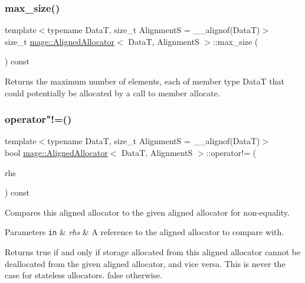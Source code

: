 \subsubsection{\texorpdfstring{max\+\_\+size()}{max\_size()}}
{\footnotesize\ttfamily template$<$typename DataT, size\+\_\+t AlignmentS = \+\_\+\+\_\+alignof(\+Data\+T)$>$ \\
size\+\_\+t \hyperlink{structmage_1_1_aligned_allocator}{mage\+::\+Aligned\+Allocator}$<$ DataT, AlignmentS $>$\+::max\+\_\+size (\begin{DoxyParamCaption}{ }\end{DoxyParamCaption}) const\hspace{0.3cm}{\ttfamily [noexcept]}}

Returns the maximum number of elements, each of member type {\ttfamily DataT} that could potentially be allocated by a call to member allocate. \hypertarget{structmage_1_1_aligned_allocator_a878ebf0d8ad7e6e91bc9d788c8bdbbc7}{}\label{structmage_1_1_aligned_allocator_a878ebf0d8ad7e6e91bc9d788c8bdbbc7} 
\subsubsection{\texorpdfstring{operator"!=()}{operator!=()}}
{\footnotesize\ttfamily template$<$typename DataT, size\+\_\+t AlignmentS = \+\_\+\+\_\+alignof(\+Data\+T)$>$ \\
bool \hyperlink{structmage_1_1_aligned_allocator}{mage\+::\+Aligned\+Allocator}$<$ DataT, AlignmentS $>$\+::operator!= (\begin{DoxyParamCaption}\item[{const \hyperlink{structmage_1_1_aligned_allocator}{Aligned\+Allocator}$<$ DataT, AlignmentS $>$ \&}]{rhs }\end{DoxyParamCaption}) const\hspace{0.3cm}{\ttfamily [noexcept]}}

Compares this aligned allocator to the given aligned allocator for non-\/equality.


\begin{DoxyParams}[1]{Parameters}
\mbox{\tt in}  & {\em rhs} & A reference to the aligned allocator to compare with. \\
\hline
\end{DoxyParams}
\begin{DoxyReturn}{Returns}
{\ttfamily true} if and only if storage allocated from this aligned allocator cannot be deallocated from the given aligned allocator, and vice versa. This is never the case for stateless allocators. {\ttfamily false} otherwise. 
\end{DoxyReturn}
\hypertarget{structmage_1_1_aligned_allocator_ae30b9ecaee6492dc7828e693953d6080}{}\label{structmage_1_1_aligned_allocator_ae30b9ecaee6492dc7828e693953d6080} 
